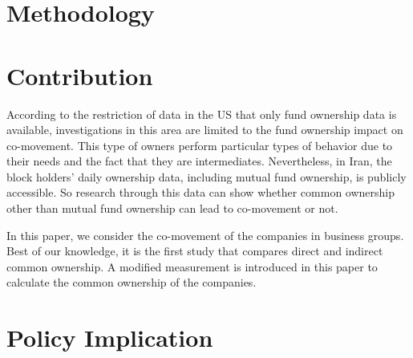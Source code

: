 \documentclass[12pt, a4paper]{article}
\begin{document}
\section*{Methodology}

\section*{Contribution}
According to the restriction of data in the US that only fund ownership data is available, investigations in this area are limited to the fund ownership impact on co-movement. This type of owners perform particular types of behavior due to their needs and the fact that they are intermediates.
	Nevertheless, in Iran, the block holders' daily ownership data, including mutual fund ownership, is publicly accessible. So research through this data can show whether common ownership other than mutual fund ownership can lead to co-movement or not.

	
		In this paper, we consider the co-movement of the companies in business groups. Best of our knowledge, it is the first study that compares direct and indirect common ownership.
		A modified measurement is introduced in this paper to calculate the common ownership of the companies. 

\section*{Policy Implication}











	


	
\newpage
	{
	\footnotesize
	
	
}
\end{document}
